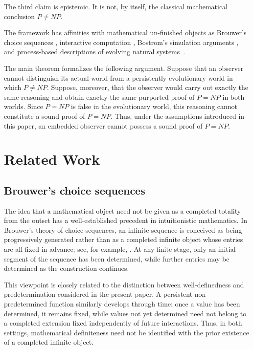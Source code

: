 \documentclass[11pt]{article}
\begin{document}
The third claim is epistemic.  It is not, by itself, the classical mathematical conclusion
\(P\neq NP\).

The framework has affinities with mathematical un-finished objects as Brouwer's choice sequences
\cite{TroelstraVanDalen1988,VanAtten2007}, interactive computation
\cite{Goldin2000,GoldinSmolkaWegner2006,GoldinWegner2008}, Bostrom's simulation arguments
\cite{Bostrom2003}, and   process-based descriptions of evolving natural systems~\cite{WongEtAl2023}.   

 The main theorem formalizes the following argument. Suppose that an observer cannot distinguish its actual world from a persistently evolutionary world in which \(P\neq NP\). Suppose, moreover, that the observer would carry out exactly the same reasoning and obtain exactly the same purported proof of \(P=NP\) in both worlds. Since \(P=NP\) is false in the evolutionary world, this reasoning cannot constitute a sound proof of \(P=NP\). Thus, under the assumptions introduced in this paper, an embedded observer cannot possess a sound proof of \(P=NP\).

 \section{Related Work}
\label{sec:related-work}

\subsection{Brouwer's choice sequences}

The idea that a mathematical object need not be given as a completed totality from the outset
has a well-established precedent in intuitionistic mathematics.  In Brouwer's theory of
choice sequences, an infinite sequence is conceived as being progressively generated rather
than as a completed infinite object whose entries are all fixed in advance; see, for example,
\cite{TroelstraVanDalen1988,VanAtten2007}.  At any finite stage, only an initial segment of
the sequence has been determined, while further entries may be determined as the construction
continues.

This viewpoint is closely related to the distinction between well-definedness and
predetermination considered in the present paper.  A persistent non-predetermined function
similarly develops through time: once a value has been determined, it remains fixed, while
values not yet determined need not belong to a completed extension fixed independently of
future interactions.  Thus, in both settings, mathematical definiteness need not be identified
with the prior existence of a completed infinite object.
\end{document}
